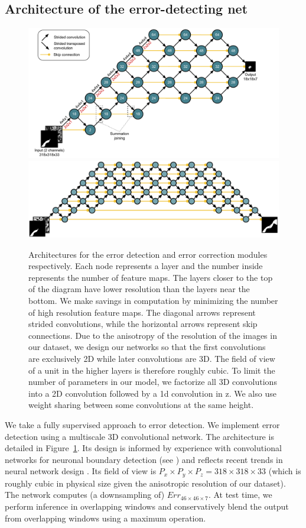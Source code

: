 \documentclass{article}
\begin{document}
\subsection{Architecture of the error-detecting net}
\begin{figure}
\centering
\includegraphics[width=1.0\linewidth]{detector.pdf}
\centering
\includegraphics[width=1.0\linewidth]{corrector2.pdf}

\caption{Architectures for the error detection and error correction modules respectively. Each node represents a layer and the number inside represents the number of feature maps. The layers closer to the top of the diagram have lower resolution than the layers near the bottom. We make savings in computation by minimizing the number of high resolution feature maps. The diagonal arrows represent strided convolutions, while the horizontal arrows represent skip connections. Due to the anisotropy of the resolution of the images in our dataset, we design our networks so that the first convolutions are exclusively 2D while later convolutions are 3D. The field of view of a unit in the higher layers is therefore roughly cubic.
To limit the number of parameters in our model, we factorize all 3D convolutions into a 2D convolution followed by a 1d convolution in z. We also use weight sharing between some convolutions at the same height.}
\label{fig:architecture}
\end{figure}
We take a fully supervised approach to error detection. We implement error detection using a multiscale 3D convolutional network. The architecture is detailed in Figure~\ref{fig:architecture}. Its design is informed by experience with convolutional networks for neuronal boundary detection (see \cite{kisuk}) and reflects recent trends in neural network design \cite{unet,resnet}. Its field of view is $P_x\times P_y\times P_z=318\times 318\times 33$ (which is roughly cubic in physical size given the anisotropic resolution of our dataset). The network computes (a downsampling of) $Err_{46 \times 46 \times 7}$. At test time, we perform inference in overlapping windows and conservatively blend the output from overlapping windows using a maximum operation.
\end{document}

